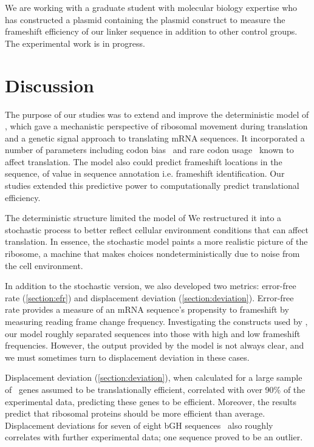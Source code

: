 \documentclass[12pt]{article}
\begin{document}
We are working with a graduate student with molecular biology expertise 
who has constructed a plasmid containing the plasmid construct
to measure the frameshift efficiency of our linker sequence in addition 
to other control groups. The experimental work is in progress.

\section{Discussion}
\label{section:discussion}

The purpose of our studies was to extend and improve the deterministic
model of \citeauthor{lalit:mechanics}, which gave a mechanistic
perspective of ribosomal movement during translation and a genetic
signal approach to translating mRNA sequences. It incorporated a
number of parameters including
codon bias~\cite{ikemura} and rare codon usage~\cite{kane95} known to
affect translation. The model also could predict frameshift locations
in the sequence, of value in sequence annotation i.e. frameshift identification.
Our studies extended this predictive power to 
computationally predict translational efficiency.

The deterministic structure limited the model of \citeauthor{lalit:mechanics}
We restructured it into a stochastic process to better reflect cellular
environment conditions that can affect translation. In essence, the
stochastic model paints a more realistic picture of the ribosome, a
machine that makes choices nondeterministically due to noise from the
cell environment.

In addition to the stochastic version, we also developed two metrics:
error-free rate (\autoref{section:efr}) and displacement deviation
(\autoref{section:deviation}). Error-free rate
provides a measure of an mRNA sequence's propensity to frameshift by
measuring reading frame change frequency.  Investigating the constructs used by
\citet{weiss87}, our model roughly separated sequences into
those with high and low frameshift frequencies. However, the
output provided by the model is not always clear, and we must sometimes turn to
displacement deviation in these cases.

Displacement deviation (\autoref{section:deviation}),
when calculated for a large sample of \ecoli\ genes assumed to be translationally efficient,
correlated with over 90\% of the  experimental data, predicting
these genes to be efficient.  Moreover, the results predict that ribosomal proteins should
be more efficient than average.  Displacement deviations for seven of eight bGH
sequences~\cite{schoner:bgh} also roughly correlates with further
experimental data; one sequence proved to be an outlier.
\end{document}
